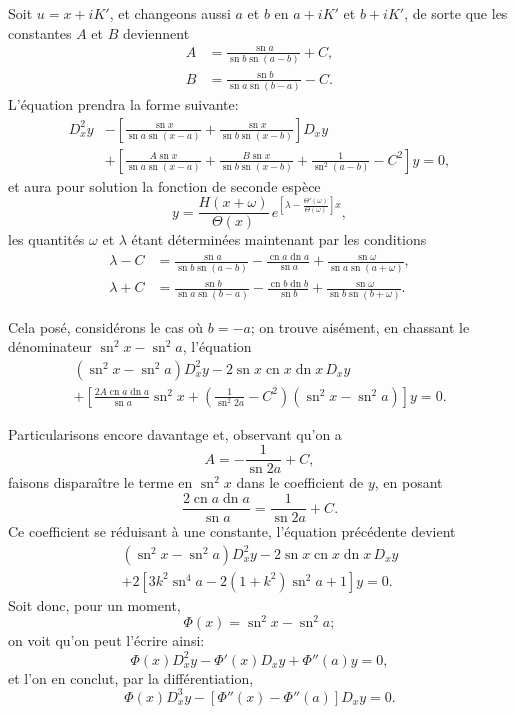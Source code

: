 \documentclass[11pt,leqno,oneside,letterpaper]{book}[2005/09/16]
\DeclareMathOperator{\sn}{sn}
\DeclareMathOperator{\cn}{cn}
\DeclareMathOperator{\dn}{dn}
\begin{document}
Soit $u = x + iK'$, et changeons aussi $a$ et $b$ en $a + iK'$ et $b + iK'$, de
sorte que les constantes $A$ et $B$ deviennent
\begin{align*}
A &= \frac{\sn a}{\sn b \sn(a - b)} + C, \\
B &= \frac{\sn b}{\sn a \sn(b - a)} - C.
\end{align*}
L'\'equation prendra la forme suivante:
\[
\begin{split}
D^2_x y &- \left[ \frac{  \sn x}{\sn a \sn(x-a)}
                 + \frac{  \sn x}{\sn b \sn(x-b)} \right] D_x y \\
        &+ \left[ \frac{A \sn x}{\sn a \sn(x-a)}
                 + \frac{B \sn x}{\sn b \sn(x-b)}
                 + \frac{1}{\sn^2 (a-b)} - C^2 \right] y = 0,
\end{split}
\]
et aura pour solution la fonction de seconde esp\`ece
\[
y = \frac{H(x + \omega)}{\Theta(x)}\,
  e^{ \left[\lambda - \frac{\Theta'(\omega)}{\Theta(\omega)} \right] x},
\]
les quantit\'es $\omega$ et $\lambda$ \'etant d\'etermin\'ees maintenant par les conditions
\begin{align*}
\lambda - C &= \frac{\sn a}{\sn b \sn(a-b)}
  - \frac{\cn a \dn a}{\sn a} + \frac{\sn \omega}{\sn a \sn (a+\omega)}, \\
\lambda + C &= \frac{\sn b}{\sn a \sn(b-a)}
  - \frac{\cn b \dn b}{\sn b} + \frac{\sn \omega}{\sn b \sn (b+\omega)}.
\end{align*}

Cela pos\'e, consid\'erons le cas o\`u $b =-a$; on trouve ais\'ement, en
chassant le d\'enominateur $\sn^2 x - \sn^2 a$, l'\'equation
\begin{multline*}
(\sn^2 x - \sn^2 a) D^2_x y - 2\sn x \cn x \dn x\, D_x y \\
   + \left[ \frac{2A \cn a \dn a}{\sn a} \sn^2 x
           + \left( \frac{1}{\sn^2 2a} - C^2 \right) (\sn^2 x - \sn^2 a)
   \right] y = 0.
\end{multline*}

Particularisons encore davantage et, observant qu'on a
\[
A = -\frac{1}{\sn 2a} + C,
\]
faisons dispara\^itre le terme en $\sn^2 x$ dans le coefficient de $y$, en posant
\[
\frac{2 \cn a \dn a}{\sn a} = \frac{1}{\sn 2a} + C.
\]
Ce coefficient se r\'eduisant \`a une constante, l'\'equation pr\'ec\'edente devient
\begin{multline*}
(\sn^2 x - \sn^2 a) D^2_x y - 2 \sn x \cn x \dn x\, D_x y \\
  + 2\left[3 k^2 \sn^4 a - 2(1+k^2) \sn^2 a + 1 \right] y = 0.
\end{multline*}
\label{page106}
Soit donc, pour un moment,
\[
\Phi(x) = \sn^2 x - \sn^2 a;
\]
on voit qu'on peut l'\'ecrire ainsi:
\[
\Phi(x) D^2_x y - \Phi'(x) D_x y + \Phi''(a) y = 0,
\]
et l'on en conclut, par la diff\'erentiation,
\[
\Phi(x) D^3_x y - \left[ \Phi''(x) - \Phi''(a) \right] D_x y = 0.
\]
\end{document}
